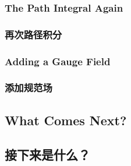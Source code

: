 \documentclass{article}
\begin{document}
\begin{paracol}{2}
\subsubsection{The Path Integral Again}
\switchcolumn
\subsubsection*{再次路径积分}
\switchcolumn*

\subsubsection{Adding a Gauge Field}
\switchcolumn
\subsubsection*{添加规范场}
\switchcolumn*

\subsection{What Comes Next?}
\switchcolumn
\subsection*{接下来是什么？}
\switchcolumn*
\end{paracol}
\end{document}
